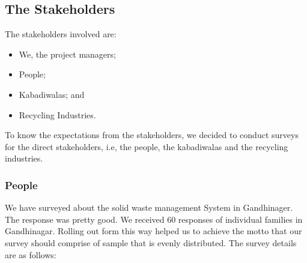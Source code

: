\documentclass{article}
\begin{document}
\subsection{The Stakeholders}
\par The stakeholders involved are:
\begin{itemize}
\item We, the project managers;
\item People;
\item Kabadiwalas; and
\item Recycling Industries.
\end{itemize}
\par To know the expectations from the stakeholders, we decided to conduct surveys for the direct stakeholders, i.e, the people, the kabadiwalas and the recycling industries.
\subsubsection{{People}}
\par We have surveyed about the solid waste management System in  Gandhinager. The response was pretty good. We received 60 responses of individual families in Gandhinagar. Rolling out form this way helped us to achieve the motto that our survey should comprise of sample that is evenly distributed. The survey details are as follows:
\end{document}
